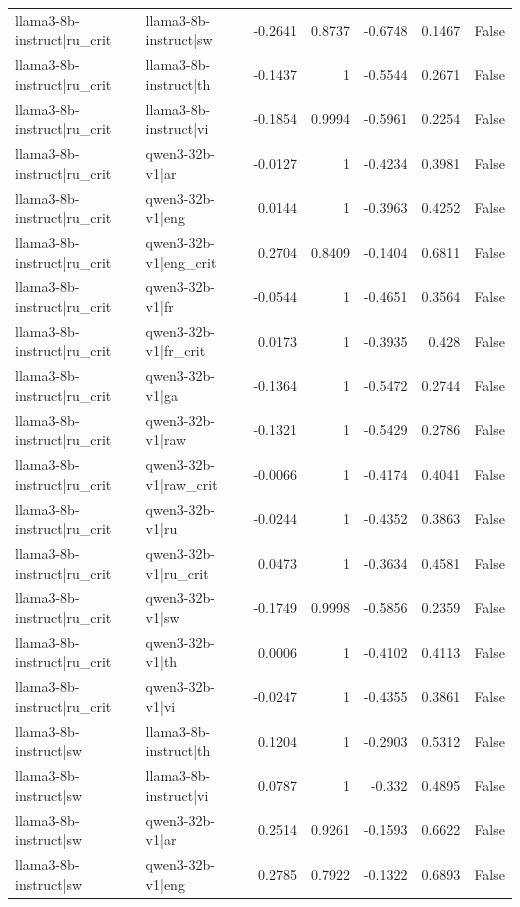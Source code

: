 \begin{table}
\begin{tabular}{l l r r r r l}
llama3-8b-instruct|ru_crit & llama3-8b-instruct|sw & -0.2641 & 0.8737 & -0.6748 & 0.1467 & False \\
llama3-8b-instruct|ru_crit & llama3-8b-instruct|th & -0.1437 & 1 & -0.5544 & 0.2671 & False \\
llama3-8b-instruct|ru_crit & llama3-8b-instruct|vi & -0.1854 & 0.9994 & -0.5961 & 0.2254 & False \\
llama3-8b-instruct|ru_crit & qwen3-32b-v1|ar & -0.0127 & 1 & -0.4234 & 0.3981 & False \\
llama3-8b-instruct|ru_crit & qwen3-32b-v1|eng & 0.0144 & 1 & -0.3963 & 0.4252 & False \\
llama3-8b-instruct|ru_crit & qwen3-32b-v1|eng_crit & 0.2704 & 0.8409 & -0.1404 & 0.6811 & False \\
llama3-8b-instruct|ru_crit & qwen3-32b-v1|fr & -0.0544 & 1 & -0.4651 & 0.3564 & False \\
llama3-8b-instruct|ru_crit & qwen3-32b-v1|fr_crit & 0.0173 & 1 & -0.3935 & 0.428 & False \\
llama3-8b-instruct|ru_crit & qwen3-32b-v1|ga & -0.1364 & 1 & -0.5472 & 0.2744 & False \\
llama3-8b-instruct|ru_crit & qwen3-32b-v1|raw & -0.1321 & 1 & -0.5429 & 0.2786 & False \\
llama3-8b-instruct|ru_crit & qwen3-32b-v1|raw_crit & -0.0066 & 1 & -0.4174 & 0.4041 & False \\
llama3-8b-instruct|ru_crit & qwen3-32b-v1|ru & -0.0244 & 1 & -0.4352 & 0.3863 & False \\
llama3-8b-instruct|ru_crit & qwen3-32b-v1|ru_crit & 0.0473 & 1 & -0.3634 & 0.4581 & False \\
llama3-8b-instruct|ru_crit & qwen3-32b-v1|sw & -0.1749 & 0.9998 & -0.5856 & 0.2359 & False \\
llama3-8b-instruct|ru_crit & qwen3-32b-v1|th & 0.0006 & 1 & -0.4102 & 0.4113 & False \\
llama3-8b-instruct|ru_crit & qwen3-32b-v1|vi & -0.0247 & 1 & -0.4355 & 0.3861 & False \\
llama3-8b-instruct|sw & llama3-8b-instruct|th & 0.1204 & 1 & -0.2903 & 0.5312 & False \\
llama3-8b-instruct|sw & llama3-8b-instruct|vi & 0.0787 & 1 & -0.332 & 0.4895 & False \\
llama3-8b-instruct|sw & qwen3-32b-v1|ar & 0.2514 & 0.9261 & -0.1593 & 0.6622 & False \\
llama3-8b-instruct|sw & qwen3-32b-v1|eng & 0.2785 & 0.7922 & -0.1322 & 0.6893 & False \\

\end{tabular}
\end{table}
